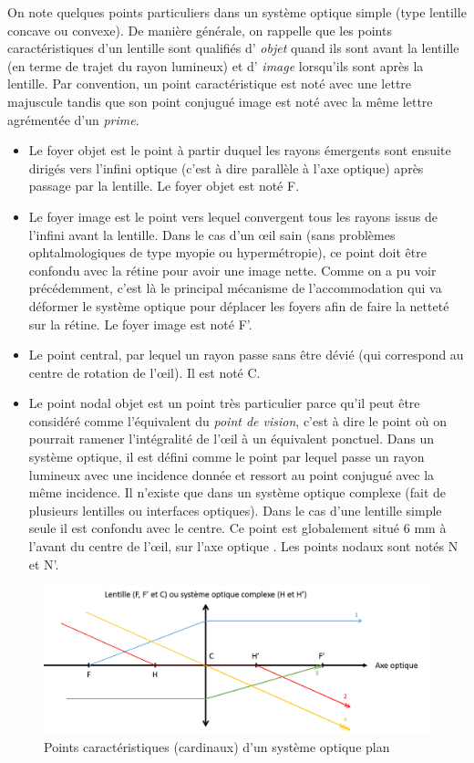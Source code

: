 	\par On note quelques points particuliers dans un système optique simple (type lentille concave ou convexe). De manière générale, on rappelle que les points caractéristiques d'un lentille sont qualifiés d' \textit{objet} quand ils sont avant la lentille (en terme de trajet du rayon lumineux) et d' \textit{image} lorsqu'ils sont après la lentille. Par convention, un point caractéristique est noté avec une lettre majuscule tandis que son point conjugué image est noté avec la même lettre agrémentée d'un \textit{prime}.
	\begin{itemize}
		\item Le foyer objet est le point à partir duquel les rayons émergents sont ensuite dirigés vers l'infini optique (c'est à dire parallèle à l'axe optique) après passage par la lentille. Le foyer objet est noté F.
		\item Le foyer image est le point vers lequel convergent tous les rayons issus de l'infini avant la lentille. Dans le cas d'un œil sain (sans problèmes ophtalmologiques de type myopie ou hypermétropie), ce point doit être confondu avec la rétine pour avoir une image nette. Comme on a pu voir précédemment, c'est là le principal mécanisme de l'accommodation qui va déformer le système optique pour déplacer les foyers afin de faire la netteté sur la rétine. Le foyer image est noté F'.
		\item Le point central, par lequel un rayon passe sans être dévié (qui correspond au centre de rotation de l'œil). Il est noté C.
		\item Le point nodal objet est un point très particulier parce qu'il peut être considéré comme l'équivalent du \textit{point de vision}, c'est à dire le point où on pourrait ramener l'intégralité de l'œil à un équivalent ponctuel. Dans un système optique, il est défini comme le point par lequel passe un rayon lumineux avec une incidence donnée et ressort au point conjugué avec la même incidence. Il n'existe que dans un système optique complexe (fait de plusieurs lentilles ou interfaces optiques). Dans le cas d'une lentille simple seule il est confondu avec le centre. Ce point est globalement situé 6 mm à l'avant du centre de l'œil, sur l'axe optique \citep{gross_human_2008,ogle_optics:_1968}. Les points nodaux sont notés N et N'.
	\end{itemize}
	
	\begin{figure}[h]
		\centering
		\includegraphics[scale=.5]{Figures/PointsSystemeOptique}
		\caption{Points caractéristiques (cardinaux) d'un système optique plan}
		\label{fig:points_cardinaux_systeme_optique}
	\end{figure}
	
